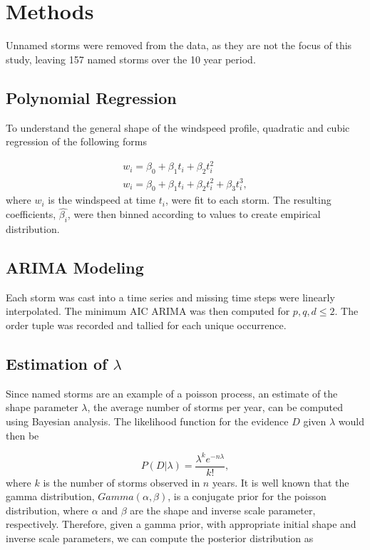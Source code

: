 \documentclass{article}
\begin{document}
	\section{Methods}	 
	 Unnamed storms were removed from the data, as they are not the focus of this study, leaving 157 named storms over the 10 year period. 

	\subsection{Polynomial Regression}
	To understand the general shape of the windspeed profile, quadratic and cubic regression of the following forms
	
		\begin{align}
			w_i = \beta_0 + \beta_1 t_i + \beta_2 t_i^2\\
			w_i = \beta_0 + \beta_1 t_i + \beta_2 t_i^2 + \beta_3 t_i^3,
		\end{align}
	where $w_i$ is the windspeed at time $t_i$, were fit to each storm. The resulting coefficients, $\hat{\beta_i}$, were then binned 
according to values to create empirical distribution.

	\subsection{ARIMA Modeling}
	Each storm was cast into a time series and missing time steps were linearly interpolated. The minimum AIC ARIMA was then computed for $p, q, d \le 2$. The order tuple was recorded and tallied for each unique occurrence.

	\subsection{Estimation of $\lambda$}
	Since named storms are an example of a poisson process, an estimate of the shape parameter $\lambda$, the average number of storms per year, can be computed using Bayesian analysis. The likelihood function for the evidence $D$ given $\lambda$ would then be
	
		\begin{equation}
			P(D | \lambda) = \frac{\lambda^k e^{-n \lambda}}{k!},
		\end{equation}
		where $k$ is the number of storms observed in $n$ years. It is well known that the gamma distribution, $Gamma(\alpha, \beta)$, is a conjugate prior for the poisson distribution, where $\alpha$ and $\beta$ are the shape and inverse scale parameter, respectively. Therefore, given a gamma prior, with appropriate initial shape and inverse scale parameters, we can compute the posterior distribution as
		
\end{document}
